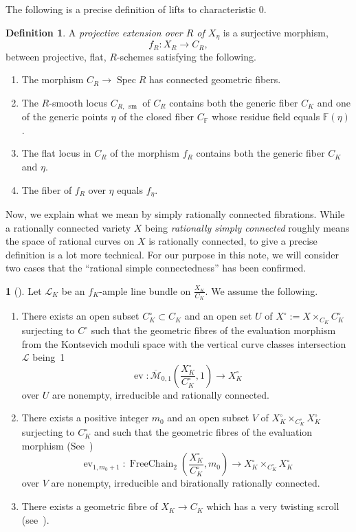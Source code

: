 \documentclass[11pt]{article}
\theoremstyle{definition}
\newtheorem{defi}[theo]{Definition}
\newcommand{\enoncename}{}
\newtheorem{corpusenonce}[theo]{\enoncename}
\newenvironment{enonce}[1]{\renewcommand{\enoncename}{#1}\begin{corpusenonce}}{\end{corpusenonce}}
\numberwithin{equation}{section}
\numberwithin{figure}{section}
\numberwithin{table}{section}
\newcommand{\mbb}{\mathbb}
\newcommand{\FF}{\mbb{F}}
\newcommand{\Xx}{X}
\newcommand{\Cc}{C}
\newcommand{\Rr}{R}
\newcommand{\FR}{K}
\DeclareMathOperator{\ev}{ev}
\DeclareMathOperator{\FreeChain}{FreeChain}
\DeclareMathOperator{\SP}{Spec}
\DeclareMathOperator{\sm}{sm}
\begin{document}
The following is a precise definition of lifts to characteristic $0$.


\begin{defi}\label{defn-lift-b}
A \emph{projective extension over $\Rr$ of $\Xx_\eta$} is a surjective morphism,
\[
f_\Rr :\Xx_\Rr \to \Cc_\Rr,
\]
between projective, flat, $R$-schemes satisfying the following.
\begin{enumerate}
\item \label{list1.1.1}The morphism $\Cc_\Rr\to \SP \Rr$ has connected geometric fibers.
\item \label{list1.1.2}The $R$-smooth locus $\Cc_{\Rr,\,\sm}$ of $\Cc_\Rr$ contains both the generic fiber $\Cc_\FR$ and one of the generic points $\eta$ of the closed fiber $\Cc_\FF$ whose residue field equals $\FF(\eta)$.
\item \label{list1.1.3}The flat locus in $\Cc_\Rr$ of the morphism $f_\Rr$ contains both the generic fiber $\Cc_\FR$ and $\eta$.
\item \label{list1.1.4}The fiber of $f_\Rr$ over $\eta$ equals $f_\eta$.
\end{enumerate}
\end{defi}


Now, we explain what we mean by simply rationally connected fibrations. While a rationally connected variety $X$ being \emph{rationally simply connected} roughly means the space of rational curves on $X$ is rationally connected, to give a precise definition is a lot more technical. For our purpose in this note, we will consider two cases that the ``rational simple connectedness'' has been confirmed.

\begin{enonce}
{Hypothesis}[\cite{dJHS}]\label{h-dJHS}
Let $\mathcal{L}_K$ be an $f_K$-ample line bundle on $\frac{X_K}{C_K}$. We assume the
following.
\begin{enumerate}
\item \label{list1.2.1}There exists an open subset $C^{\circ}_K\subset C_K$ and an open set $U$ of $X^{\circ}:=X\times_{C_K}{C^{\circ}_K}$ surjecting to $C^{\circ}$ such that the geometric fibres of the evaluation morphism from the Kontsevich moduli space with the vertical curve classes intersection $\mathcal{L}$ being~1
\[
\ev \colon \overline{\mathcal{M}}_{0,1}\left(\frac{X^{\circ}_K}{C^{\circ}_K}, 1\right)\to X^{\circ}_K
\]
over $U$ are nonempty, irreducible and rationally connected.
\item \label{list1.2.2} There exists a positive integer $m_0$ and an open subset $V$ of $X^{\circ}_K\times_{C^{\circ}_K} X^{\circ}_K$ surjecting to $C^{\circ}_K$ and such that the geometric fibres of the evaluation morphism (See~\cite[P.~30]{dJHS})
\[
\ev_{1,m_0+1} \colon \FreeChain_2\left(\frac{X^{\circ}_K}{C^{\circ}_K},m_0\right) \to X^{\circ}_K\times_{C^{\circ}_K} X^{\circ}_K
\]
over $V$ are nonempty, irreducible and birationally rationally connected.
\item \label{list1.2.3} There exists a geometric fibre of $X_K\to C_K$ which has a very twisting scroll (see~\cite[Definition~12.3]{dJHS}).
\end{enumerate}
\end{enonce}
\end{document}
